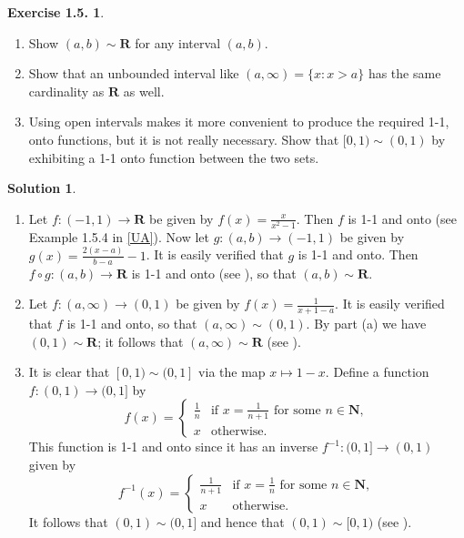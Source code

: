 \documentclass[12pt]{article}
\theoremstyle{definition}
\theoremstyle{exercise}
\newtheorem{exercise}{Exercise 1.5.}
\theoremstyle{solution}
\newtheorem*{solution}{Solution}
\newcommand{\N}{\mathbf{N}}
\newcommand{\R}{\mathbf{R}}
\begin{document}
\begin{exercise}
\label{ex:4}
    \begin{enumerate}
        \item Show \( (a, b) \sim \R \) for any interval \( (a, b) \).

        \item Show that an unbounded interval like \( (a, \infty) = \{ x : x > a \} \) has the same cardinality as \( \R \) as well.

        \item Using open intervals makes it more convenient to produce the required 1-1, onto functions, but it is not really necessary. Show that \( [0, 1) \sim (0, 1) \) by exhibiting a 1-1 onto function between the two sets.
    \end{enumerate}
\end{exercise}

\begin{solution}
    \begin{enumerate}
        \item Let \( f : (-1, 1) \to \R \) be given by \( f(x) = \tfrac{x}{x^2 - 1} \). Then \( f \) is 1-1 and onto (see Example 1.5.4 in \hyperlink{ua}{[UA]}). Now let \( g : (a, b) \to (-1, 1) \) be given by \( g(x) = \tfrac{2(x - a)}{b - a} - 1 \). It is easily verified that \( g \) is 1-1 and onto. Then \( f \circ g : (a, b) \to \R \) is 1-1 and onto (see ), so that \( (a, b) \sim \R \).

        \item Let \( f : (a, \infty) \to (0, 1) \) be given by \( f(x) = \tfrac{1}{x + 1 - a} \). It is easily verified that \( f \) is 1-1 and onto, so that \( (a, \infty) \sim (0, 1) \). By part (a) we have \( (0, 1) \sim \R \); it follows that \( (a, \infty) \sim \R \) (see ).

        \item It is clear that \( [0, 1) \sim (0, 1] \) via the map \( x \mapsto 1 - x \). Define a function \( f : (0, 1) \to (0, 1] \) by
        \[
            f(x) = \begin{cases}
                \tfrac{1}{n} & \text{if } x = \tfrac{1}{n + 1} \text{ for some } n \in \N, \\
                x & \text{otherwise}.
            \end{cases}
        \]
        This function is 1-1 and onto since it has an inverse \( f^{-1} : (0, 1] \to (0, 1) \) given by
        \[
            f^{-1}(x) = \begin{cases}
                \tfrac{1}{n + 1} & \text{if } x = \tfrac{1}{n} \text{ for some } n \in \N, \\
                x & \text{otherwise}.
            \end{cases}
        \]
        It follows that \( (0, 1) \sim (0, 1] \) and hence that \( (0, 1) \sim [0, 1) \) (see ).
    \end{enumerate}
\end{solution}
\end{document}
